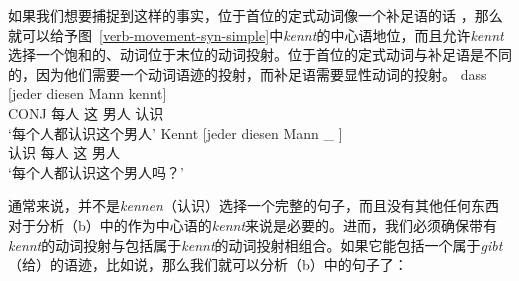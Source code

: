 如果我们想要捕捉到这样的事实，位于首位的定式动词像一个补足语的话 \citep{Hoehle97a}，那么就可以给予图~\ref{verb-movement-syn-simple}中\emph{kennt}的中心语地位，而且允许\emph{kennt}选择一个饱和的、动词位于末位的动词投射。位于首位的定式动词与补足语是不同的，因为他们需要一个动词语迹的投射，而补足语需要显性动词的投射。
\eal
\ex 
\gll dass [jeder diesen Mann kennt]\\
     CONJ \spacebr{} 每人 这 男人 认识\\
\glt `每个人都认识这个男人'
\ex 
\gll Kennt [jeder diesen Mann \_ ]\\
	 认识 \spacebr{}每人 这 男人\\
\glt `每个人都认识这个男人吗？'
\zl

\noindent
通常来说，并不是\emph{kennen}（认识）选择一个完整的句子，而且没有其他任何东西对于分析（b）中的作为中心语的\emph{kennt}来说是必要的。进而，我们必须确保带有\emph{kennt}的动词投射与包括属于\emph{kennt}的动词投射相组合。如果它能包括一个属于\emph{gibt}（给）的语迹，比如说，那么我们就可以分析（b）中的句子了：
\largerpage
\eal
{}
\zl

